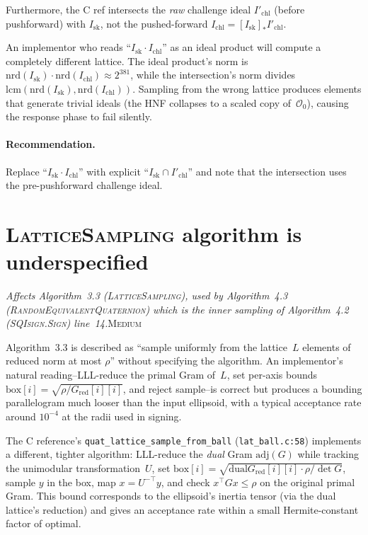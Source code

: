\documentclass[a4paper,11pt]{article}
\newcommand{\algo}[1]{Algorithm~#1}
\newcommand{\medium}{\textsc{\color{RoyalBlue}Medium}}
\newcommand{\finding}[2]{\noindent\textit{#1}\hfill#2\par\smallskip}
\begin{document}
Furthermore, the C ref intersects the \emph{raw} challenge ideal
$I'_{\mathrm{chl}}$ (before pushforward) with $I_{\mathrm{sk}}$,
not the pushed-forward $I_{\mathrm{chl}} = [I_{\mathrm{sk}}]_*
I'_{\mathrm{chl}}$.

An implementor who reads ``$I_{\mathrm{sk}} \cdot I_{\mathrm{chl}}$''
as an ideal product will compute a completely different lattice.  The
ideal product's norm is
$\mathrm{nrd}(I_{\mathrm{sk}}) \cdot \mathrm{nrd}(I_{\mathrm{chl}})
\approx 2^{381}$, while the intersection's norm divides
$\mathrm{lcm}(\mathrm{nrd}(I_{\mathrm{sk}}),
\mathrm{nrd}(I_{\mathrm{chl}}))$. Sampling from the wrong lattice
produces elements that generate trivial ideals (the HNF collapses to
a scaled copy of~$\mathcal{O}_0$), causing the response phase to
fail silently.

\paragraph{Recommendation.}
Replace ``$I_{\mathrm{sk}} \cdot I_{\mathrm{chl}}$'' with explicit
``$I_{\mathrm{sk}} \cap I'_{\mathrm{chl}}$'' and note that the
intersection uses the pre-pushforward challenge ideal.

\section{\textsc{LatticeSampling} algorithm is underspecified}
\label{sec:lattice-sampling}

\finding{Affects \algo{3.3}
(\textsc{LatticeSampling}), used by \algo{4.3}
(\textsc{RandomEquivalentQuaternion}) which is the inner sampling
of \algo{4.2} (\textsc{SQIsign.Sign}) line~14.}{\medium}

\algo{3.3} is described as ``sample uniformly from the lattice~$L$
elements of reduced norm at most $\rho$'' without specifying the
algorithm.  An implementor's natural reading--LLL-reduce the primal
Gram of~$L$, set per-axis bounds
$\mathrm{box}[i] = \sqrt{\rho / G_{\mathrm{red}}[i][i]}$, and reject
sample--is correct but produces a bounding parallelogram much looser
than the input ellipsoid, with a typical acceptance rate around
$10^{-4}$ at the radii used in signing.

The C reference's \texttt{quat\_lattice\_sample\_from\_ball}
(\texttt{lat\_ball.c:58}) implements a different, tighter algorithm:
LLL-reduce the \emph{dual} Gram $\mathrm{adj}(G)$ while tracking the
unimodular transformation~$U$, set
$\mathrm{box}[i] = \sqrt{\mathrm{dual}G_{\mathrm{red}}[i][i]
\cdot \rho / \det G}$, sample $y$ in the box, map
$x = U^{-\top} y$, and check $x^\top G x \le \rho$ on the original
primal Gram.  This bound corresponds to the ellipsoid's inertia
tensor (via the dual lattice's reduction) and gives an acceptance
rate within a small Hermite-constant factor of optimal.
\end{document}
